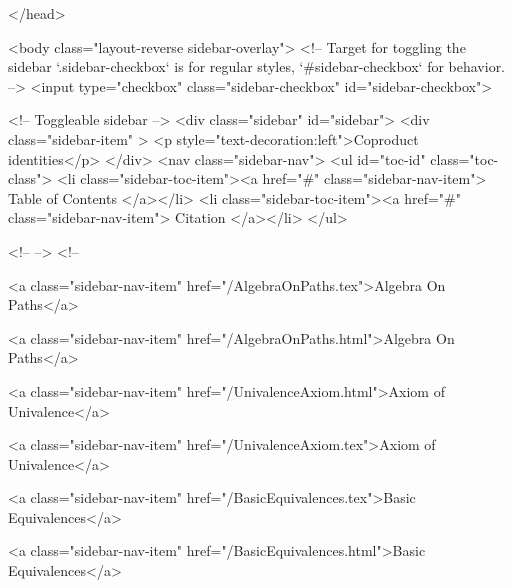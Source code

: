   
</head>




  <body class="layout-reverse sidebar-overlay">
    <!-- Target for toggling the sidebar `.sidebar-checkbox` is for regular
     styles, `#sidebar-checkbox` for behavior. -->
<input type="checkbox" class="sidebar-checkbox" id="sidebar-checkbox">

<!-- Toggleable sidebar -->
<div class="sidebar" id="sidebar">
  <div class="sidebar-item" >
    <p style="text-decoration:left">Coproduct identities</p>
  </div>
  <nav class="sidebar-nav">
    <ul id="toc-id" class="toc-class">
  <li class="sidebar-toc-item"><a href="#" class="sidebar-nav-item"> Table of Contents </a></li>
  <li class="sidebar-toc-item"><a href="#" class="sidebar-nav-item"> Citation </a></li>
</ul>


    <!--  -->
    <!-- 
      
    
      
    
      
    
      
    
      
        
      
    
      
        
          <a class="sidebar-nav-item" href="/AlgebraOnPaths.tex">Algebra On Paths</a>
        
      
    
      
        
          <a class="sidebar-nav-item" href="/AlgebraOnPaths.html">Algebra On Paths</a>
        
      
    
      
        
          <a class="sidebar-nav-item" href="/UnivalenceAxiom.html">Axiom of Univalence</a>
        
      
    
      
        
          <a class="sidebar-nav-item" href="/UnivalenceAxiom.tex">Axiom of Univalence</a>
        
      
    
      
        
          <a class="sidebar-nav-item" href="/BasicEquivalences.tex">Basic Equivalences</a>
        
      
    
      
        
          <a class="sidebar-nav-item" href="/BasicEquivalences.html">Basic Equivalences</a>
        

